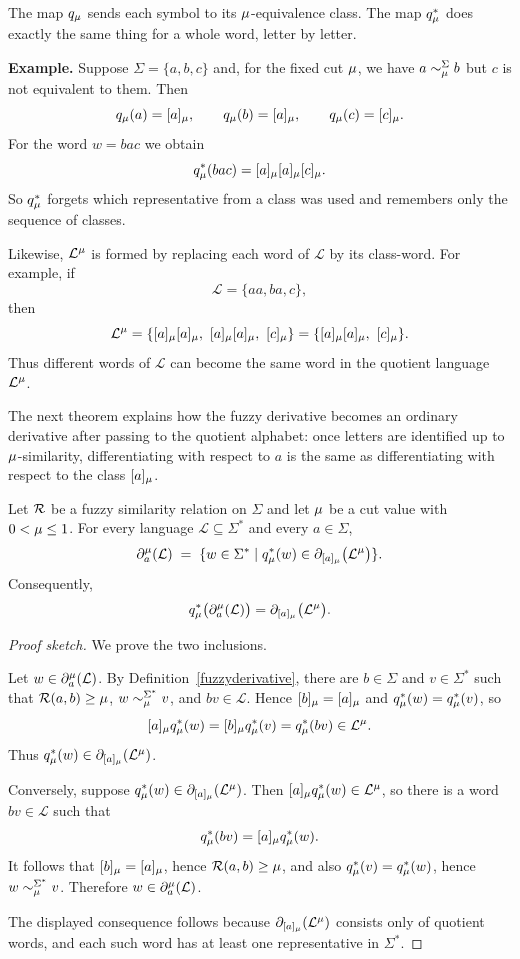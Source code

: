 \noindent
The map $q_\mu$ sends each symbol to its $\mu$-equivalence class. The map
$q_\mu^*$ does exactly the same thing for a whole word, letter by letter.

\smallskip
\noindent
\textbf{Example.} Suppose $\Sigma=\{a,b,c\}$ and, for the fixed cut $\mu$, we
have $a\sim_\mu^\Sigma b$ but $c$ is not equivalent to them. Then
\[
  q_\mu(a)=[a]_\mu,\qquad q_\mu(b)=[a]_\mu,\qquad q_\mu(c)=[c]_\mu.
\]
For the word $w=bac$ we obtain
\[
  q_\mu^*(bac)=[a]_\mu [a]_\mu [c]_\mu.
\]
So $q_\mu^*$ forgets which representative from a class was used and remembers
only the sequence of classes.

\smallskip
\noindent
Likewise, $\mathcal L^\mu$ is formed by replacing each word of $\mathcal L$ by
its class-word. For example, if
\[
  \mathcal L=\{aa,ba,c\},
\]
then
\[
  \mathcal L^\mu
  =
  \{[a]_\mu[a]_\mu,\ [a]_\mu[a]_\mu,\ [c]_\mu\}
  =
  \{[a]_\mu[a]_\mu,\ [c]_\mu\}.
\]
Thus different words of $\mathcal L$ can become the same word in the quotient
language $\mathcal L^\mu$.

\noindent
The next theorem explains how the fuzzy derivative becomes an ordinary derivative
after passing to the quotient alphabet: once letters are identified up to
$\mu$-similarity, differentiating with respect to $a$ is the same as
differentiating with respect to the class $[a]_\mu$.

\begin{theorem}\label{the:quotient-fuzzy-derivative}
Let ${\mathcal R}$ be a fuzzy similarity relation on $\Sigma$ and let $\mu$ be a cut value
with $0 < \mu \le 1$. For every language $\mathcal L \subseteq \Sigma^*$ and every
$a\in\Sigma$,
\[
  \partial_a^\mu(\mathcal L)
  \;=\;
  \{w\in\Sigma^* \mid q_\mu^*(w)\in
       \partial_{[a]_\mu}\bigl(\mathcal L^\mu\bigr)\}.
\]
Consequently,
\[
  q_\mu^*\bigl(\partial_a^\mu(\mathcal L)\bigr)
  =
  \partial_{[a]_\mu}\bigl(\mathcal L^\mu\bigr).
\]
\end{theorem}

\begin{proof}[Proof sketch]
We prove the two inclusions.

Let $w\in\partial_a^\mu(\mathcal L)$. By Definition~\ref{fuzzyderivative},
there are $b\in\Sigma$ and $v\in\Sigma^*$ such that ${\mathcal R}(a,b)\ge\mu$,
$w\sim_\mu^{\Sigma^*}v$, and $bv\in\mathcal L$. Hence
$[b]_\mu=[a]_\mu$ and $q_\mu^*(w)=q_\mu^*(v)$, so
\[
  [a]_\mu q_\mu^*(w)
  =
  [b]_\mu q_\mu^*(v)
  =
  q_\mu^*(bv)
  \in \mathcal L^\mu.
\]
Thus $q_\mu^*(w)\in\partial_{[a]_\mu}(\mathcal L^\mu)$.

Conversely, suppose $q_\mu^*(w)\in\partial_{[a]_\mu}(\mathcal L^\mu)$. Then
$[a]_\mu q_\mu^*(w)\in\mathcal L^\mu$, so there is a word $bv\in\mathcal L$
such that
\[
  q_\mu^*(bv)=[a]_\mu q_\mu^*(w).
\]
It follows that $[b]_\mu=[a]_\mu$, hence ${\mathcal R}(a,b)\ge\mu$, and also
$q_\mu^*(v)=q_\mu^*(w)$, hence $w\sim_\mu^{\Sigma^*}v$. Therefore
$w\in\partial_a^\mu(\mathcal L)$.

The displayed consequence follows because
$\partial_{[a]_\mu}(\mathcal L^\mu)$ consists only of quotient words, and each
such word has at least one representative in $\Sigma^*$.
\end{proof}

